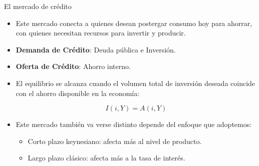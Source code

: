 \documentclass{beamer}
\begin{document}
\begin{frame}{El mercado de crédito}
    \begin{itemize}
        \item Este mercado conecta a quienes desean postergar consumo hoy para ahorrar, con quienes necesitan recursos para invertir y producir.
        \item \textbf{Demanda de Crédito}: Deuda pública e Inversión.
        \item \textbf{Oferta de Crédito}: Ahorro interno.
        \item El equilibrio se alcanza cuando el volumen total de inversión deseada coincide con el ahorro disponible en la economía:
                \begin{center}
                \begin{tcolorbox}[width=2in, boxsep=0pt, left=0pt, right=0pt, top=2pt,colframe = blue!70!black, colback = blue!7!white]%
                        $$ I(i,Y)=A(i,Y) $$
                \end{tcolorbox}
                \end{center}
        \item Este mercado también va verse distinto depende del enfoque que adoptemos:
        \begin{itemize}
            \item Corto plazo keynesiano: afecta más al nivel de producto.
            \item Largo plazo clásico: afecta más a la tasa de interés.
        \end{itemize}
    \end{itemize}
\end{frame}
\end{document}
